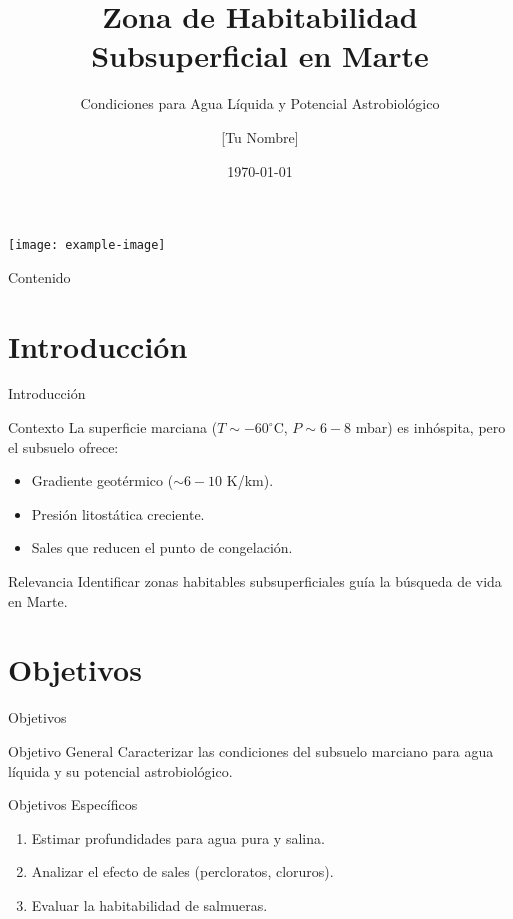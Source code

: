 \documentclass{beamer}
\title{\textbf{Zona de Habitabilidad Subsuperficial en Marte}}
\subtitle{Condiciones para Agua Líquida y Potencial Astrobiológico}
\author{[Tu Nombre]}
\institute{[Tu Institución]}
\date{\today}
\begin{document}
\begin{frame}
  \titlepage
  \begin{center}
    \texttt{[image: example-image]}
  \end{center}
\end{frame}

\begin{frame}{Contenido}
  \tableofcontents
\end{frame}

\section{Introducción}
\begin{frame}{Introducción}
  \begin{block}{Contexto}
    La superficie marciana ($T \sim -60^{\circ}\mathrm{C}$, $P \sim 6-8$ mbar) es inhóspita, pero el subsuelo ofrece:
    \begin{itemize}
      \item Gradiente geotérmico ($\sim 6-10$ K/km).
      \item Presión litostática creciente.
      \item Sales que reducen el punto de congelación.
    \end{itemize}
  \end{block}
  \begin{block}{Relevancia}
    Identificar zonas habitables subsuperficiales guía la búsqueda de vida en Marte.
  \end{block}
\end{frame}

\section{Objetivos}
\begin{frame}{Objetivos}
  \begin{block}{Objetivo General}
    Caracterizar las condiciones del subsuelo marciano para agua líquida y su potencial astrobiológico.
  \end{block}
  \begin{block}{Objetivos Específicos}
    \begin{enumerate}
      \item Estimar profundidades para agua pura y salina.
      \item Analizar el efecto de sales (percloratos, cloruros).
      \item Evaluar la habitabilidad de salmueras.
    \end{enumerate}
  \end{block}
\end{frame}
\end{document}
